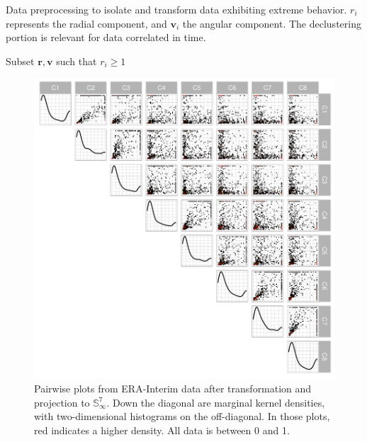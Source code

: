 \begin{algorithm}[htb]
    \footnotesize
   \caption{Data preprocessing to isolate and transform data exhibiting extreme behavior.  $r_i$
   represents the radial component, and $\bm{v}_i$ the angular component.  The declustering
   portion is relevant for data correlated in time.\label{algo:processing}}
  Subset $\bm{ r},\bm{ v}$ such that $r_i \geq 1$\\
\end{algorithm}

\begin{figure}[ht]%
    \centering
    \caption{Pairwise plots from ERA-Interim data after transformation and projection to ${\mathbb S}_{\infty}^{7}$.  Down the diagonal are marginal kernel densities, with two-dimensional histograms on the off-diagonal.  In those plots, red indicates a higher density.  All data is between 0 and 1.\label{fig:erai_data}}
    \includegraphics[width=.8\linewidth]{./images/data_transformed}
\end{figure}

